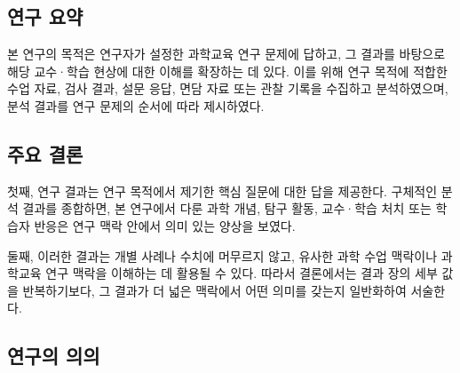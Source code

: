\subsection{연구 요약}


본 연구의 목적은 연구자가 설정한 과학교육 연구 문제에 답하고, 그 결과를 바탕으로 해당 교수·학습 현상에 대한 이해를 확장하는 데 있다.
이를 위해 연구 목적에 적합한 수업 자료, 검사 결과, 설문 응답, 면담 자료 또는 관찰 기록을 수집하고 분석하였으며, 분석 결과를 연구 문제의 순서에 따라 제시하였다.

\subsection{주요 결론}

%
%
%

첫째, 연구 결과는 연구 목적에서 제기한 핵심 질문에 대한 답을 제공한다.
구체적인 분석 결과를 종합하면, 본 연구에서 다룬 과학 개념, 탐구 활동, 교수·학습 처치 또는 학습자 반응은 연구 맥락 안에서 의미 있는 양상을 보였다.

둘째, 이러한 결과는 개별 사례나 수치에 머무르지 않고, 유사한 과학 수업 맥락이나 과학교육 연구 맥락을 이해하는 데 활용될 수 있다.
따라서 결론에서는 결과 장의 세부 값을 반복하기보다, 그 결과가 더 넓은 맥락에서 어떤 의미를 갖는지 일반화하여 서술한다.

\subsection{연구의 의의}


